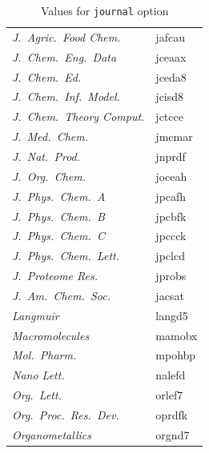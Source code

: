 \documentclass[english,journal=jctcce,etalmode=truncate,maxauthors=0]{achemso}
\begin{document}
\begin{table}
\begin{tabular}{>{\itshape}l>{\ttfamily}l}
      J.~Agric.\ Food Chem.    & jafcau  \\
      J.~Chem.\ Eng.\ Data     & jceaax  \\
      J.~Chem.\ Ed.            & jceda8  \\
      J.~Chem.\ Inf.\ Model.   & jcisd8  \\
      J.~Chem.\ Theory Comput. & jctcce  \\
      J.~Med.\ Chem.           & jmcmar  \\
      J.~Nat.\ Prod.           & jnprdf  \\
      J.~Org.\ Chem.           & joceah  \\
      J.~Phys.\ Chem.~A        & jpcafh  \\
      J.~Phys.\ Chem.~B        & jpcbfk  \\
      J.~Phys.\ Chem.~C        & jpccck  \\
      J.~Phys.\ Chem.\ Lett.   & jpclcd  \\
      J.~Proteome Res.         & jprobs  \\
      J.~Am.\ Chem.\ Soc.      & jacsat  \\
      Langmuir                 & langd5  \\
      Macromolecules           & mamobx  \\
      Mol.\ Pharm.             & mpohbp  \\
      Nano Lett.               & nalefd  \\
      Org.\ Lett.              & orlef7  \\
      Org.\ Proc.\ Res.\ Dev.  & oprdfk  \\
      Organometallics          & orgnd7  \\
    \bottomrule
  \end{tabular}
  \caption{Values for \texttt{journal} option}
  \label{tab:journal}
\end{table}

\end{document}
